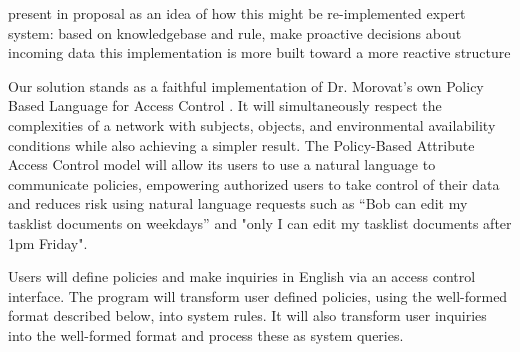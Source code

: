 \documentclass[12pt]{article}
\begin{document}
present in proposal as an idea of how this might be re-implemented
expert system: based on knowledgebase and rule, make proactive decisions about incoming data
this implementation is more built toward a more reactive structure

Our solution stands as a faithful implementation of Dr. Morovat's own Policy Based Language for Access Control \cite{morovat16}. It will simultaneously respect the complexities of a network with subjects, objects, and environmental availability conditions while also achieving a simpler result. The Policy-Based Attribute Access Control model will allow its users to use a natural language to communicate policies, empowering authorized users to take control of their data and reduces risk using natural language requests such as “Bob can edit my tasklist documents on weekdays” and "only I can edit my tasklist documents after 1pm Friday".

Users will define policies and make inquiries in English via an access control interface. The program will transform user defined policies, using the well-formed format described below, into system rules. It will also transform user inquiries into the well-formed format and process these as system queries.
\end{document}

